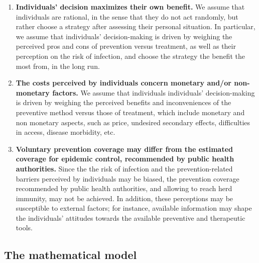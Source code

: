 \begin{enumerate}[label= \bf \roman*)]
\item \textbf{Individuals' decision maximizes their own benefit.} 
We assume that individuals are rational, in the sense that they do not act randomly, but rather  choose a strategy  after assessing their personal situation. In particular, we assume that individuals' decision-making is driven by weighing the perceived pros and cons of prevention versus treatment, as well as their perception on the risk of infection, and choose the strategy the benefit the most from, in the long run.

\item \textbf{The costs perceived by individuals concern monetary and/or non-monetary factors.} 
We assume that individuals individuals' decision-making is driven by weighing the perceived benefits and inconveniences of the preventive method versus those of treatment, which include monetary and non monetary aspects, such as price, undesired secondary effects, difficulties in access, disease morbidity, etc.


\item \textbf{Voluntary prevention coverage may differ from the estimated coverage for epidemic control, recommended by public health authorities.} 
Since the the risk of infection and the prevention-related barriers perceived by individuals may be biased, the prevention coverage recommended by public health authorities, and allowing to reach herd immunity, may not be achieved. In addition, these perceptions may be susceptible to external factors; for instance, available information may shape the individuals' attitudes towards the available preventive and therapeutic tools.
\end{enumerate}


\subsection{The mathematical model}
\label{Intro:Model} 

